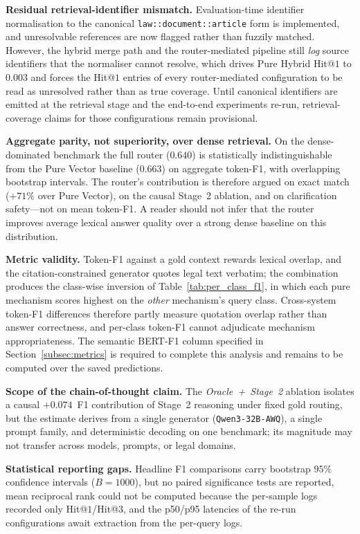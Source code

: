 \noindent\textbf{Residual retrieval-identifier mismatch.} Evaluation-time
identifier normalisation to the canonical
\texttt{law::document::article} form is implemented, and unresolvable
references are now flagged rather than fuzzily matched. However, the hybrid
merge path and the router-mediated pipeline still \emph{log} source
identifiers that the normaliser cannot resolve, which drives Pure Hybrid
Hit@$1$ to $0.003$ and forces the Hit@$1$ entries of every router-mediated
configuration to be read as unresolved rather than as true coverage. Until
canonical identifiers are emitted at the retrieval stage and the end-to-end
experiments re-run, retrieval-coverage claims for those configurations remain
provisional.

\noindent\textbf{Aggregate parity, not superiority, over dense retrieval.} On
the dense-dominated benchmark the full router ($0.640$) is statistically
indistinguishable from the Pure Vector baseline ($0.663$) on aggregate
token-F1, with overlapping bootstrap intervals. The router's contribution is
therefore argued on exact match ($+71\%$ over Pure Vector), on the causal
Stage~2 ablation, and on clarification safety---not on mean token-F1. A
reader should not infer that the router improves average lexical answer
quality over a strong dense baseline on this distribution.

\noindent\textbf{Metric validity.} Token-F1 against a gold context rewards
lexical overlap, and the citation-constrained generator quotes legal text
verbatim; the combination produces the class-wise inversion of
Table~\ref{tab:per_class_f1}, in which each pure mechanism scores highest on
the \emph{other} mechanism's query class. Cross-system token-F1 differences
therefore partly measure quotation overlap rather than answer correctness,
and per-class token-F1 cannot adjudicate mechanism appropriateness. The
semantic BERT-F1 column specified in Section~\ref{subsec:metrics} is required
to complete this analysis and remains to be computed over the saved
predictions.

\noindent\textbf{Scope of the chain-of-thought claim.} The
\textit{Oracle~+~Stage~2} ablation isolates a causal $+0.074$~F1 contribution
of Stage~2 reasoning under fixed gold routing, but the estimate derives from
a single generator (\texttt{Qwen3-32B-AWQ}), a single prompt family, and
deterministic decoding on one benchmark; its magnitude may not transfer
across models, prompts, or legal domains.

\noindent\textbf{Statistical reporting gaps.} Headline F1 comparisons carry
bootstrap $95\%$ confidence intervals ($B=1000$), but no paired significance
tests are reported, mean reciprocal rank could not be computed because the
per-sample logs recorded only Hit@$1$/Hit@$3$, and the p50/p95 latencies of
the re-run configurations await extraction from the per-query logs.

